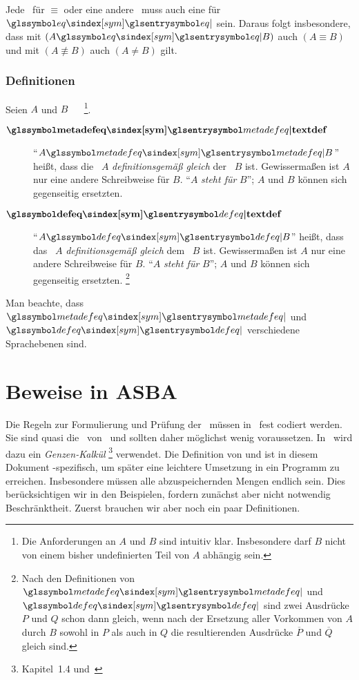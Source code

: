 Jede \interessierendeEigenschaft\ für $\equiv$ oder eine andere \Aequivalenz\ muss auch eine für $\symeq$ sein.
Daraus folgt insbesondere, dass mit $(A \symeq B)$ auch $(A \equiv B)$ und mit $(A \nequiv B)$ auch $(A \ne B)$ gilt.

\subsubsection{Definitionen}%
\label{subsub-Definitionen}

Seien $A$ und $B$ \Aussagen\ \textbzw\ \Objekte%
\footnote{%
	Die Anforderungen an $A$ und $B$ sind intuitiv klar.
	Insbesondere darf $B$ nicht von einem bisher undefinierten Teil von $A$ abhängig sein.
}.
\begin{description}
	\item[$\definition{\symmetadefeq}$]  \label{def-Metadefinition}
	\enquote{$A \symmetadefeq B$} heißt, dass die \Aussage\ $A$ \emph{definitionsgemäß gleich} der \Aussage\ $B$ ist.
	Gewissermaßen ist $A$ nur eine andere Schreibweise für $B$.
	\enquote{$A$ \emph{steht für} $B$}; $A$ und $B$ können sich gegenseitig ersetzten.
	\item[$\definition{\symdefeq}$]  \label{def-Definition}
	\enquote{$A \symdefeq B$} heißt, dass das \Objekt\ $A$ \emph{definitionsgemäß gleich} dem \Objekt\ $B$ ist.
	Gewissermaßen ist $A$ nur eine andere Schreibweise für $B$.
	\enquote{$A$ \emph{steht für} $B$}; $A$ und $B$ können sich gegenseitig ersetzten.%
	\footnote{%
		Nach den Definitionen von $\symmetadefeq$ und $\symdefeq$ sind zwei Ausdrücke $P$ und $Q$ schon dann gleich, wenn nach der Ersetzung aller Vorkommen von $A$ durch $B$ sowohl in $P$ als auch in $Q$ die resultierenden Ausdrücke $\overline{P}$ und $\overline{Q}$ gleich sind.
	}
\end{description}
Man beachte, dass $\symmetadefeq$ und $\symdefeq$ verschiedene Sprachebenen sind.

\section{Beweise in ASBA}%
\label{sec-BeweiseASBA}

Die Regeln zur Formulierung und Prüfung der \Beweise\ müssen in \ASBA\ fest codiert werden.
Sie sind quasi die \Axiome\ von \ASBA\ und sollten daher möglichst wenig voraussetzen.
In \ASBA\ wird dazu ein \emph{Genzen-Kalkül}%
\footnote{%
	 Kapitel~1.4 und~\cite{bib:Schlussregel,bib:NatuerlichesSchliessen}
} verwendet.
Die Definition von \emph{\Schlussregel} und \emph{\Beweis} ist in diesem Dokument \ASBA-spezifisch, um später eine leichtere Umsetzung in ein Programm zu erreichen.
Insbesondere müssen alle abzuspeichernden Mengen endlich sein.
Dies berücksichtigen wir in den Beispielen, fordern zunächst aber nicht notwendig Beschränktheit.
Zuerst brauchen wir aber noch ein paar Definitionen.

